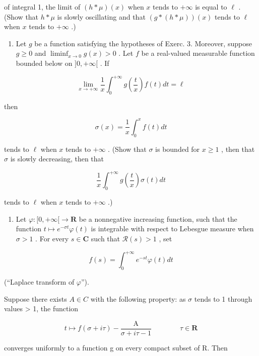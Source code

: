 of integral 1, the limit of \((h * \mu)(x)\) when \(x\) tends to \(+\infty\) is equal to \(\ell\) . (Show that \(h * \mu\) is slowly oscillating and that \((g * (h * \mu))(x)\) tends to \(\ell\) when \(x\) tends to \(+\infty\) .)

\begin{enumerate}
\def\labelenumi{\arabic{enumi})}
\setcounter{enumi}{7}
\tightlist
\item
  Let \(g\) be a function satisfying the hypotheses of Exerc. 3. Moreover, suppose \(g \geqslant 0\) and \(\liminf_{x \to 0} g(x) > 0\) . Let \(f\) be a real-valued measurable function bounded below on \(]0, +\infty[\) . If
\end{enumerate}

\[
\lim _ {x \to + \infty} \frac {1}{x} \int_ {0} ^ {+ \infty} g \left(\frac {t}{x}\right) f (t) d t = \ell
\]

then

\[
\sigma (x) = \frac {1}{x} \int_ {0} ^ {x} f (t) d t
\]

tends to \(\ell\) when \(x\) tends to \(+\infty\) . (Show that \(\sigma\) is bounded for \(x \geqslant 1\) , then that \(\sigma\) is slowly decreasing, then that

\[
\frac {1}{x} \int_ {0} ^ {+ \infty} g \left(\frac {t}{x}\right) \sigma (t) d t
\]

tends to \(\ell\) when \(x\) tends to \(+\infty\) .)

\begin{enumerate}
\def\labelenumi{\arabic{enumi})}
\setcounter{enumi}{8}
\tightlist
\item
  Let \(\varphi\colon[0,+\infty[\to\mathbf{R}\) be a nonnegative increasing function, such that the function \(t\mapsto e^{-\sigma t}\varphi(t)\) is integrable with respect to Lebesgue measure when \(\sigma>1\) . For every \(s\in\mathbf{C}\) such that \(\mathcal{R}(s)>1\) , set
\end{enumerate}

\[
f (s) = \int_ {0} ^ {+ \infty} e ^ {- s t} \varphi (t) d t
\]

(“Laplace transform of \(\varphi\)”).

Suppose there exists \(A \in C\) with the following property: as \(\sigma\) tends to 1 through values \textgreater{} 1, the function

\[
t \mapsto f (\sigma + i \tau) - \frac {\mathrm{A}}{\sigma + i \tau - 1} \qquad \qquad \tau \in \mathbf {R}
\]

converges uniformly to a function g on every compact subset of R. Then

